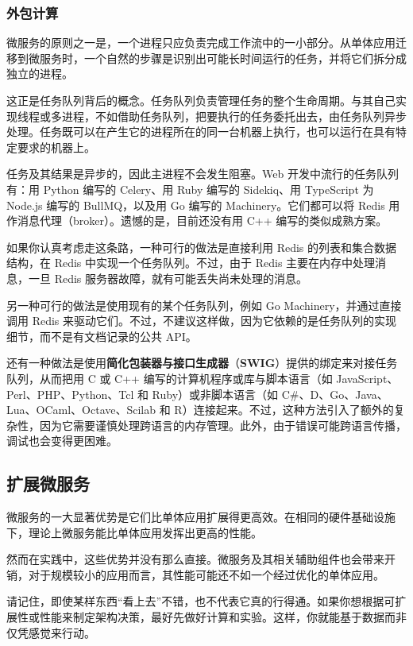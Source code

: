 \subsubsection{外包计算}

\label{idx:1445}
微服务的原则之一是，一个进程只应负责完成工作流中的一小部分。从单体应用迁移到微服务时，一个自然的步骤是识别出可能长时间运行的任务，并将它们拆分成独立的进程。

这正是任务队列背后的概念。任务队列负责管理任务的整个生命周期。与其自己实现线程或多进程，不如借助任务队列，把要执行的任务委托出去，由任务队列异步处理。任务既可以在产生它的进程所在的同一台机器上执行，也可以运行在具有特定要求的机器上。

任务及其结果是异步的，因此主进程不会发生阻塞。Web 开发中流行的任务队列有：用 Python 编写的 Celery、用 Ruby 编写的 Sidekiq、用 TypeScript 为 Node.js 编写的 BullMQ，以及用 Go 编写的 Machinery。它们都可以将 Redis 用作消息代理（broker）。遗憾的是，目前还没有用 C++ 编写的类似成熟方案。

如果你认真考虑走这条路，一种可行的做法是直接利用 Redis 的列表和集合数据结构，在 Redis 中实现一个任务队列。不过，由于 Redis 主要在内存中处理消息，一旦 Redis 服务器故障，就有可能丢失尚未处理的消息。

另一种可行的做法是使用现有的某个任务队列，例如 Go Machinery，并通过直接调用 Redis 来驱动它们。不过，不建议这样做，因为它依赖的是任务队列的实现细节，而不是有文档记录的公共 API。

\label{idx:1446}
\label{idx:1447}
还有一种做法是使用\textbf{简化包装器与接口生成器}（\textbf{SWIG}）提供的绑定来对接任务队列，从而把用 C 或 C++ 编写的计算机程序或库与脚本语言（如 JavaScript、Perl、PHP、Python、Tcl 和 Ruby）或非脚本语言（如 C\#、D、Go、Java、Lua、OCaml、Octave、Scilab 和 R）连接起来。不过，这种方法引入了额外的复杂性，因为它需要谨慎处理跨语言的内存管理。此外，由于错误可能跨语言传播，调试也会变得更困难。

\subsection{扩展微服务}

\label{idx:1448}
微服务的一大显著优势是它们比单体应用扩展得更高效。在相同的硬件基础设施下，理论上微服务能比单体应用发挥出更高的性能。

然而在实践中，这些优势并没有那么直接。微服务及其相关辅助组件也会带来开销，对于规模较小的应用而言，其性能可能还不如一个经过优化的单体应用。

请记住，即使某样东西“看上去”不错，也不代表它真的行得通。如果你想根据可扩展性或性能来制定架构决策，最好先做好计算和实验。这样，你就能基于数据而非仅凭感觉来行动。

